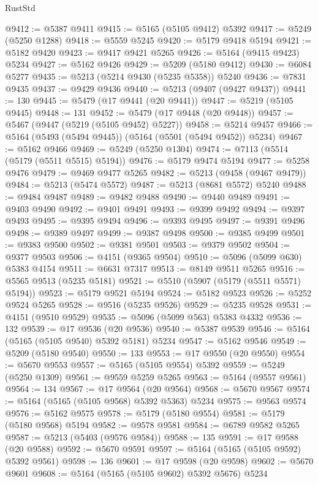 \begin{lexlean}{RustStd}
\begin{coremodule}
@9412 := @5387 @9411
@9415 := @5165 (@5105 @9412) @5392
@9417 := @5249 (@5250 @1288)
@9418 := @5559 @5245
@9420 := @5179 @9418 @5194
@9421 := @5182 @9420
@9423 := @9417 @9421 @5265
@9426 := @5164 (@9415 @9423) @5234
@9427 := @5162 @9426
@9429 := @5209 (@5180 @9412)
@9430 := @6084 @5277
@9435 := @5213 (@5214 @9430 (@5235 @5358)) @5240
@9436 := @7831 @9435
@9437 := @9429 @9436
@9440 := @5213 (@9407 (@9427 @9437))
@9441 := 130
@9445 := @5479 (@17 @9441 (@20 @9441))
@9447 := @5219 (@5105 @9445)
@9448 := 131
@9452 := @5479 (@17 @9448 (@20 @9448))
@9457 := @5467 (@9447 (@5219 (@5105 @9452) @5227))
@9458 := @5214 @9457
@9466 := @5164 (@5493 (@5494 @9445)) (@5164 (@5501 (@5494 @9452)) @5234)
@9467 := @5162 @9466
@9469 := @5249 (@5250 @1304)
@9474 := @7113 (@5514 (@5179 (@5511 @5515) @5194))
@9476 := @5179 @9474 @5194
@9477 := @5258 @9476
@9479 := @9469 @9477 @5265
@9482 := @5213 (@9458 (@9467 @9479))
@9484 := @5213 (@5474 @5572)
@9487 := @5213 (@8681 @5572) @5240
@9488 := @9484 @9487
@9489 := @9482 @9488
@9490 := @9440 @9489
@9491 := @9403 @9490
@9492 := @9401 @9491
@9493 := @9399 @9492
@9494 := @9397 @9493
@9495 := @9395 @9494
@9496 := @9393 @9495
@9497 := @9391 @9496
@9498 := @9389 @9497
@9499 := @9387 @9498
@9500 := @9385 @9499
@9501 := @9383 @9500
@9502 := @9381 @9501
@9503 := @9379 @9502
@9504 := @9377 @9503
@9506 := @4151 (@9365 @9504)
@9510 := @5096 (@5099 @630) @5383 @4154
@9511 := @6631 @7317
@9513 := @8149 @9511 @5265
@9516 := @5565 @9513 (@5235 @5181)
@9521 := @5510 (@5907 (@5179 (@5511 @5571) @5194))
@9523 := @5179 @9521 @5194
@9524 := @5182 @9523
@9526 := @5252 @9524 @5265
@9528 := @9516 (@5235 @9526)
@9529 := @5235 @9528
@9531 := @4151 (@9510 @9529)
@9535 := @5096 (@5099 @563) @5383 @4332
@9536 := 132
@9539 := @17 @9536 (@20 @9536)
@9540 := @5387 @9539
@9546 := @5164 (@5165 (@5105 @9540) @5392 @5181) @5234
@9547 := @5162 @9546
@9549 := @5209 (@5180 @9540)
@9550 := 133
@9553 := @17 @9550 (@20 @9550)
@9554 := @5670 @9553
@9557 := @5165 (@5105 @9554) @5392
@9559 := @5249 (@5250 @1309)
@9561 := @9559 @5259 @5265
@9563 := @5164 (@9557 @9561)
@9564 := 134
@9567 := @17 @9564 (@20 @9564)
@9568 := @5670 @9567
@9574 := @5164 (@5165 (@5105 @9568) @5392 @5363) @5234
@9575 := @9563 @9574
@9576 := @5162 @9575
@9578 := @5179 (@5180 @9554)
@9581 := @5179 (@5180 @9568) @5194
@9582 := @9578 @9581
@9584 := @6789 @9582 @5265
@9587 := @5213 (@5403 (@9576 @9584))
@9588 := 135
@9591 := @17 @9588 (@20 @9588)
@9592 := @5670 @9591
@9597 := @5164 (@5165 (@5105 @9592) @5392 @9561)
@9598 := 136
@9601 := @17 @9598 (@20 @9598)
@9602 := @5670 @9601
@9608 := @5164 (@5165 (@5105 @9602) @5392 @5676) @5234

\end{coremodule}
\end{lexlean}
